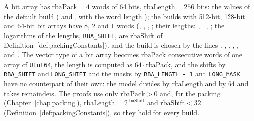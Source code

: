 \begin{definition}\label{def:rbaPack}
  \leanok
  A bit array has $\mathrm{rbaPack} = 4$ words of 64 bits, $\mathrm{rbaLength} = 256$ bits: the
  values of the default build ( and
  , with the word length ); the builds
  with 512-bit, 128-bit and 64-bit bit arrays have 8, 2 and 1 words
  (, ,
  , ; their lengths:
  , ,
  , ; the logarithms of the lengths,
  \verb|RBA_SHIFT|, are $\mathrm{rbaShift}$ of Definition~\ref{def:packingConstants}), and the build
  is chosen by the lines , ,
  , ,
  ,  and
  . The vector type of a bit array becomes $\mathrm{rbaPack}$
  consecutive words of one array of \verb|UInt64|, the length is computed as
  $64 \cdot \mathrm{rbaPack}$, and the shifts by \verb|RBA_SHIFT| and \verb|LONG_SHIFT| and the
  masks by \verb|RBA_LENGTH - 1| and \verb|LONG_MASK| have no counterpart of their own: the model
  divides by $\mathrm{rbaLength}$ and by 64 and takes remainders. The proofs use only
  $\mathrm{rbaPack} > 0$ and, for the packing (Chapter~\ref{chap:packing}),
  $\mathrm{rbaLength} = 2^{\mathrm{rbaShift}}$ and $\mathrm{rbaShift} < 32$
  (Definition~\ref{def:packingConstants}), so they hold for every build.
\end{definition}

